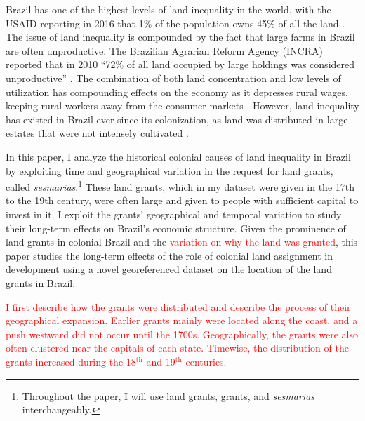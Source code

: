 \documentclass[11pt]{article}
\newcommand{\red}[1]{\textcolor{red}{#1}}
\begin{document}
Brazil has one of the highest levels of land inequality in the world, with the USAID reporting in 2016 that 1\% of the population owns 45\% of all the land \parencite{Usaid2016-xs}. 
The issue of land inequality is compounded by the fact that large farms in Brazil are often unproductive.
The Brazilian Agrarian Reform Agency (INCRA) reported that in 2010 ``72\% of all land occupied by large holdings was considered unproductive'' \parencite{Carlson2019-mk}.
The combination of both land concentration and low levels of utilization has compounding effects on the economy as it depresses rural wages, keeping rural workers away from the consumer markets \parencite[p.~1]{De_Oliveira_Andrade1980-xz}.
However, land inequality has existed in Brazil ever since its colonization, as land was distributed in large estates that were not intensely cultivated \parencite[p.~53]{Mueller1995-gi}. 

In this paper, I analyze the historical colonial causes of land inequality in Brazil by exploiting time and geographical variation in the request for land grants, called \textit{sesmarias}.\footnote{Throughout the paper, I will use land grants, grants, and \textit{sesmarias} interchangeably.}
These land grants, which in my dataset were given in the 17th to the 19th century, were often large and given to people with sufficient capital to invest in it.
I exploit the grants' geographical and temporal variation to study their long-term effects on Brazil's economic structure.  
Given the prominence of land grants in colonial Brazil and the \red{variation on why the land was granted}, this paper studies the long-term effects of the role of colonial land assignment in development using a novel georeferenced dataset on the location of the land grants in Brazil.  

\begin{comment}
\red{I further expand the models from [add the old literature] studying the relationship between land size and productivity.}
\end{comment}

\red{
I first describe how the grants were distributed and describe the process of their geographical expansion. 
Earlier grants mainly were located along the coast, and a push westward did not occur until the 1700s. 
Geographically, the grants were also often clustered near the capitals of each state.
Timewise, the distribution of the grants increased during the 18$^\text{th}$ and 19$^\text{th}$ centuries.}
\end{document}
